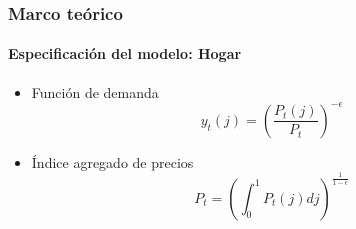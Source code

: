 \documentclass[10pt]{beamer}
\begin{document}
 
 
\begin{frame}
\frametitle{Marco teórico}
\framesubtitle{Especificación del modelo: Hogar}
\begin{itemize}
\item<1-> Función de demanda
\begin{equation}
y_{t}(j)=\left(\frac{P_{t}(j)}{P_{t}} \right)^{-\epsilon}
\end{equation}

\item<2-> Índice agregado de precios
\begin{equation}
P_{t}=  \left( \int_{0}^{1} P_{t}(j) dj \right) ^{\frac{1}{1-\epsilon}}
\end{equation}
\end{itemize}
 \end{frame}
 
\end{document}
